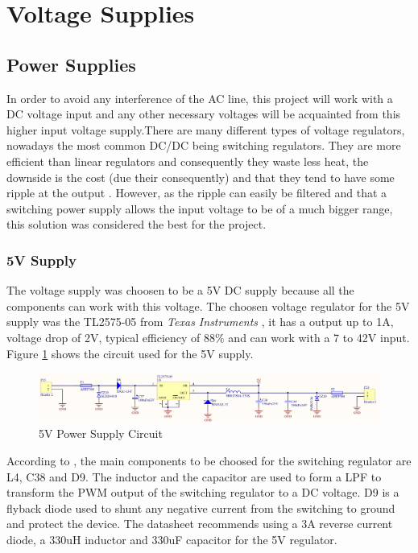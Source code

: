 \section{Voltage Supplies}\label{sec:voltage-supplies}

	\subsection{Power Supplies}\label{ssec:power-supplies}
		In order to avoid any interference of the AC line, this project will work with a DC voltage input and any other necessary voltages will be acquainted from this higher input voltage supply.There are many different types of voltage regulators, nowadays the most common DC/DC being switching regulators. They are more efficient than linear regulators and consequently they waste less heat, the downside is the cost (due their consequently) and that they tend to have some ripple at the output \cite{schweber2017}. However, as the ripple can easily be filtered and that a switching power supply allows the input voltage to be of a much bigger range, this solution was considered the best for the project. 

		\subsubsection{5V Supply}\label{sssec:5v-supply}
			The voltage supply was choosen to be a 5V DC supply because all the components can work with this voltage. The choosen voltage regulator for the 5V supply was the TL2575-05 from \textit{Texas Instruments} \cite{tl2575-05-datasheet}, it has a output up to 1A, voltage drop of 2V, typical efficiency of 88$\%$ and can work with a 7 to 42V input. Figure \ref{fig:tl2575-05-circuit} shows the circuit used for the 5V supply.

			\begin{figure}[htbp]
				\centering
					\includegraphics[width=.8\textwidth]{figuras/fig-tl2575-05-circuit.png}
				\caption{5V Power Supply Circuit}
				\label{fig:tl2575-05-circuit}
			\end{figure}

			According to \cite{tl2575-05-datasheet}, the main components to be choosed for the switching regulator are L4, C38 and D9. The inductor and the capacitor are used to form a LPF to transform the PWM output of the switching regulator to a DC voltage. D9 is a flyback diode used to shunt any negative current from the switching to ground and protect the device. The datasheet recommends using a 3A reverse current diode, a 330uH inductor and 330uF capacitor for the 5V regulator.

